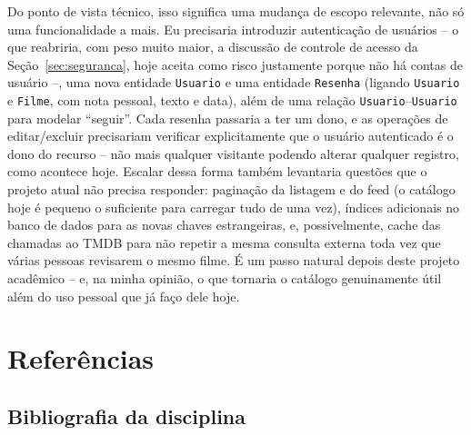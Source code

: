 \documentclass[12pt,a4paper]{article}
\begin{document}
Do ponto de vista técnico, isso significa uma mudança de escopo relevante, não só uma
funcionalidade a mais. Eu precisaria introduzir autenticação de usuários -- o que reabriria, com
peso muito maior, a discussão de controle de acesso da Seção~\ref{sec:seguranca}, hoje aceita
como risco justamente porque não há contas de usuário --, uma nova entidade \texttt{Usuario} e
uma entidade \texttt{Resenha} (ligando \texttt{Usuario} e \texttt{Filme}, com nota pessoal, texto
e data), além de uma relação \texttt{Usuario}--\texttt{Usuario} para modelar ``seguir''. Cada
resenha passaria a ter um dono, e as operações de editar/excluir precisariam verificar
explicitamente que o usuário autenticado é o dono do recurso -- não mais qualquer visitante
podendo alterar qualquer registro, como acontece hoje. Escalar dessa forma também levantaria
questões que o projeto atual não precisa responder: paginação da listagem e do feed (o catálogo
hoje é pequeno o suficiente para carregar tudo de uma vez), índices adicionais no banco de dados
para as novas chaves estrangeiras, e, possivelmente, cache das chamadas ao TMDB para não repetir
a mesma consulta externa toda vez que várias pessoas revisarem o mesmo filme. É um passo natural
depois deste projeto acadêmico -- e, na minha opinião, o que tornaria o catálogo genuinamente
útil além do uso pessoal que já faço dele hoje.

\section{Referências}

\subsection{Bibliografia da disciplina}
\end{document}
